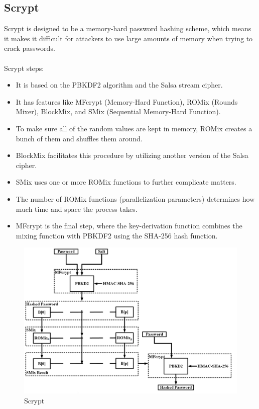\documentclass[10pt,oneside,english,a4paper]{article}
\begin{document}
\subsection{Scrypt}
Scrypt is designed to be a memory-hard password hashing scheme, which means it makes it difficult for attackers to use large amounts of memory when trying to crack passwords.
\\\\
Scrypt steps: 

\begin{itemize}
\item It is based on the PBKDF2 algorithm and the Salsa stream cipher.
\item It has features like 
MFcrypt (Memory-Hard Function), 
ROMix (Rounds Mixer), 
BlockMix, and 
SMix (Sequential Memory-Hard Function).

\item To make sure all of the random values are kept in memory, ROMix creates a  bunch of them and shuffles them around.
\item BlockMix facilitates this procedure by utilizing another version of the Salsa cipher.
\item SMix uses one or more ROMix functions to further complicate matters.
\item The number of ROMix functions (parallelization parameters) determines how much time and space the process takes.
\item MFcrypt is the final step, where the key-derivation function combines the mixing function with PBKDF2 using the SHA-256 hash function.
\end{itemize}

\begin{figure}[h]
	\centering
	\includegraphics[scale = 0.10]{Scrypt2.png}
	\caption{Scrypt}
	\label{}
\end{figure}
\end{document}
